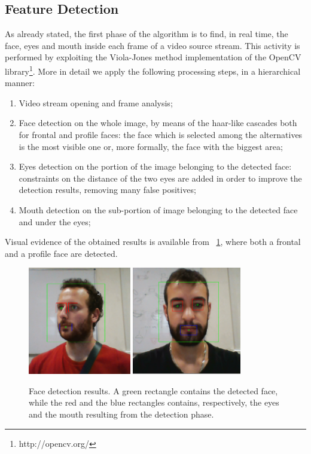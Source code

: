 \documentclass[10pt,a4paper]{report}
\begin{document}
\subsection*{Feature Detection}
As already stated, the first phase of the algorithm is to find, in real time, the face, eyes and mouth inside each frame of a video source stream. This activity is performed by exploiting the Viola-Jones method implementation of the OpenCV library\footnote{http://opencv.org/}. More in detail we apply the following processing steps, in a hierarchical manner:
\begin{enumerate}
\item Video stream opening and frame analysis;
\item Face detection on the whole image, by means of the haar-like cascades both for frontal and profile faces: the face which is selected among the alternatives is the most visible one or, more formally, the face with the biggest area;
\item Eyes detection on the portion of the image belonging to the detected face: constraints on the distance of the two eyes are added in order to improve the detection results, removing many false positives;
\item Mouth detection on the sub-portion of image belonging to the detected face and under the eyes;
\end{enumerate}
Visual evidence of the obtained results is available from \figurename~\ref{fig:facedetect}, where both a frontal and a profile face are detected.
\begin{figure}
\centering
\includegraphics[width=0.4\textwidth]{./jacopo_facedetect.png}
\includegraphics[width=0.424\textwidth]{./rob_facedetect.png}
\caption{Face detection results. A green rectangle contains the detected face, while the red and the blue rectangles contains, respectively, the eyes and the mouth resulting from the detection phase.}
\label{fig:facedetect}
\end{figure}
\end{document}
